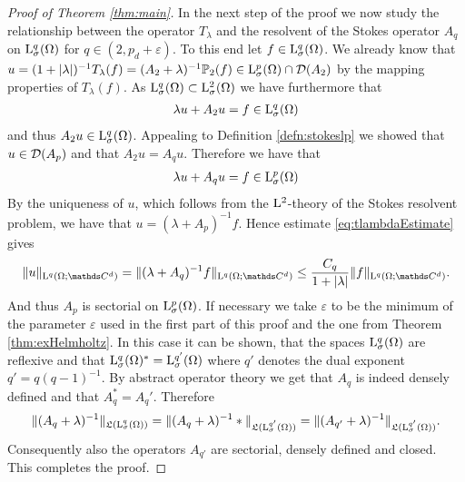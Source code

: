 \begin{proof}[Proof of Theorem \ref{thm:main}]
  In the next step of the proof we now study the relationship between the operator $T_\lambda$ and the resolvent of the Stokes operator $A_q$ on $\mathrm{L}^q_\sigma(\Omega)$ for $q \in (2, p_d + \varepsilon)$.
  To this end let $f \in \mathrm{L}^q_\sigma(\Omega)$.
  We already know that $u = (1 + |\lambda|)^{-1} T_\lambda(f) = (A_2 + \lambda)^{-1} \mathbb{P}_2(f) \in \mathrm{L}^p_\sigma(\Omega) \cap \mathcal{D}(A_2)$  by the mapping properties of $T_\lambda(f)$. As $\mathrm{L}^q_\sigma(\Omega) \subset \mathrm{L}^2_\sigma(\Omega)$ we have furthermore that
  \begin{align*}
    \lambda u + A_2 u = f \in \mathrm{L}^q_\sigma(\Omega)
  \end{align*}
  and thus $A_2 u \in \mathrm{L}^q_\sigma(\Omega)$.
  Appealing to Definition \ref{defn:stokeslp} we showed that $u \in \mathcal{D}(A_p)$ and that $A_2u = A_q u$. 
  Therefore we have that
  \begin{align*}
    \lambda u + A_q u = f \in \mathrm{L}^p_\sigma(\Omega)
  \end{align*}
  By the uniqueness of $u$, which follows from the $\mathrm{L}^2$-theory of the Stokes resolvent problem, we have that $u = (\lambda + A_p)^{-1} f$.
  Hence estimate \ref{eq:tlambdaEstimate} gives
  \begin{align*}
    \|u\|_{\Ell^q(\Omega; \C^d)} = \|(\lambda + A_q)^{-1}f \|_{\Ell^q(\Omega; \C^d)}
    \leq \frac{C_q}{ 1 + |\lambda|} \|f\|_{\Ell^q(\Omega; \C^d)}.
  \end{align*}
  And thus $A_p$ is sectorial on $\mathrm{L}^p_\sigma(\Omega)$.
  If necessary we take $\varepsilon$ to be the minimum of the parameter $\varepsilon$ used in the first part of this proof and the one from Theorem \ref{thm:exHelmholtz}.
  In this case it can be shown, that the spaces $\mathrm{L}^q_\sigma(\Omega)$ are reflexive and that $\mathrm{L}^q_\sigma(\Omega)^* = \mathrm{L}^{q'}_\sigma(\Omega)$ where $q'$ denotes the dual exponent $q' = q (q - 1)^{-1}$.
  By abstract operator theory \cite{Marcus Haase} we get that $A_q$ is indeed densely defined and that $A_q^* =  A_q'$.
  Therefore
  \begin{align*}
    \| (A_q + \lambda)^{-1} \|_{\mathfrak{L}(\mathrm{L}^q_\sigma(\Omega))}
    = \| (A_q + \lambda)^{-1}* \|_{\mathfrak{L}(\mathrm{L}^{q'}_\sigma(\Omega))}
    = \| (A_{q'} + \lambda)^{-1} \|_{\mathfrak{L}(\mathrm{L}^{q'}_\sigma(\Omega))}.
  \end{align*}
  Consequently also the operators $A_{q'}$ are sectorial, densely defined and closed.
  This completes the proof.
\end{proof}
